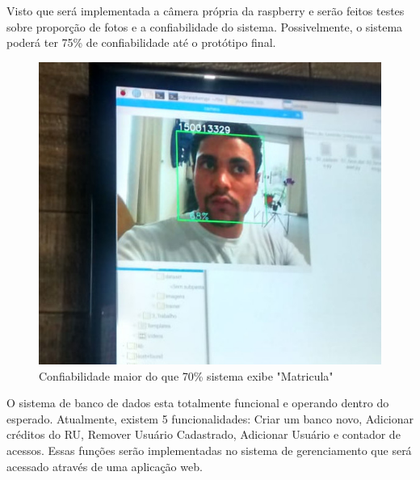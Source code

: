 \documentclass[conference,compsoc]{IEEEtran}
\begin{document}
	Visto que será implementada a câmera própria da raspberry e serão feitos  testes sobre proporção de fotos e a confiabilidade do sistema. Possivelmente, o sistema poderá ter 75\% de confiabilidade até o protótipo final.
	
	\begin{figure}[!ht]
		\centering
		\includegraphics[scale=0.25]{teste2_1.jpeg}
		\caption{Confiabilidade maior do que 70\% sistema exibe "Matricula"}
\end{figure}
	
	O sistema de banco de dados esta totalmente funcional e operando dentro do esperado. Atualmente, existem 5 funcionalidades: Criar um banco novo, Adicionar créditos do RU, Remover Usuário Cadastrado, Adicionar Usuário e contador de acessos. Essas funções serão implementadas no sistema de gerenciamento que será acessado através de uma aplicação web.  


\end{document}
